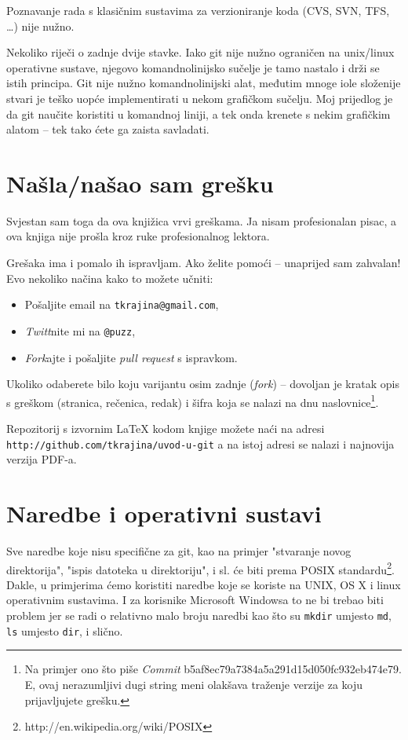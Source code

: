 Poznavanje rada s klasičnim sustavima za verzioniranje koda (CVS, SVN, TFS, \dots) nije nužno.

Nekoliko riječi o zadnje dvije stavke.
Iako git nije nužno ograničen na unix/linux operativne sustave, njegovo komandnolinijsko sučelje je tamo nastalo i drži se istih principa.
Git nije nužno komandnolinijski alat, međutim mnoge iole složenije stvari je teško uopće implementirati u nekom grafičkom sučelju. 
Moj prijedlog je da git naučite koristiti u komandnoj liniji, a tek onda krenete s nekim grafičkim alatom -- tek tako ćete ga zaista savladati.

\section*{Našla/našao sam grešku}

Svjestan sam toga da ova knjižica vrvi greškama.
Ja nisam profesionalan pisac, a ova knjiga nije prošla kroz ruke profesionalnog lektora.

Grešaka ima i pomalo ih ispravljam.
Ako želite pomoći -- unaprijed sam zahvalan!
Evo nekoliko načina kako to možete učniti:

\begin{itemize}
    \item Pošaljite email na \verb+tkrajina@gmail.com+,
    \item \emph{Twitt}nite mi na \verb+@puzz+,
    \item \emph{Fork}ajte i pošaljite \emph{pull request} s ispravkom. 
\end{itemize}

Ukoliko odaberete bilo koju varijantu osim zadnje (\emph{fork}) -- dovoljan je kratak opis s greškom (stranica, rečenica, redak) i šifra koja se nalazi na dnu naslovnice\footnote{Na primjer ono što piše \emph{Commit} b5af8ec79a7384a5a291d15d050fc932eb474e79. E, ovaj nerazumljivi dugi string meni olakšava traženje verzije za koju prijavljujete grešku.}.

Repozitorij s izvornim \LaTeX{} kodom knjige možete naći na adresi \\\verb+http://github.com/tkrajina/uvod-u-git+
 a na istoj adresi se nalazi i najnovija verzija PDF-a.

\section*{Naredbe i operativni sustavi}

Sve naredbe koje nisu specifične za git, kao na primjer "stvaranje novog direktorija", "ispis datoteka u direktoriju", i sl. će biti prema POSIX standardu\footnote{http://en.wikipedia.org/wiki/POSIX}.
Dakle, u primjerima ćemo koristiti naredbe koje se koriste na UNIX, OS X i linux operativnim sustavima. 
I za korisnike Microsoft Windowsa to ne bi trebao biti problem jer se radi o relativno malo broju naredbi kao što su \verb+mkdir+ umjesto \verb+md+, \verb+ls+ umjesto \verb+dir+, i slično.
